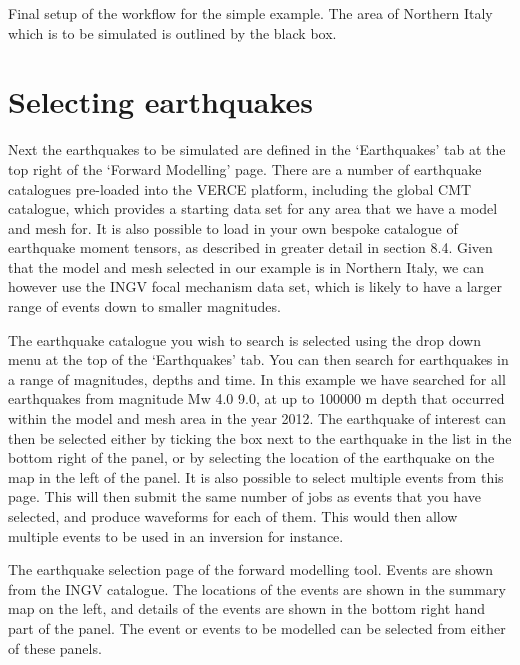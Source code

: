 \documentclass[english]{book}
\begin{document}

 Final setup of the workflow for the simple example. The
area of Northern Italy which is to be simulated is outlined by the black
box.


\section{Selecting earthquakes}
\label{\detokenize{Section5:selecting-earthquakes}}
Next the earthquakes to be simulated are defined in the ‘Earthquakes’
tab at the top right of the ‘Forward Modelling’ page. There are a number
of earthquake catalogues pre-loaded into the VERCE platform, including
the global CMT catalogue, which provides a starting data set for any
area that we have a model and mesh for. It is also possible to load in
your own bespoke catalogue of earthquake moment tensors, as described in
greater detail in section 8.4. Given that the model and mesh selected in
our example is in Northern Italy, we can however use the INGV focal
mechanism data set, which is likely to have a larger range of events
down to smaller magnitudes.

The earthquake catalogue you wish to search is selected using the drop
down menu at the top of the ‘Earthquakes’ tab. You can then search for
earthquakes in a range of magnitudes, depths and time. In this example
we have searched for all earthquakes from magnitude Mw 4.0 \textendash{} 9.0, at up
to 100000 m depth that occurred within the model and mesh area in the
year 2012. The earthquake of interest can then be selected either by
ticking the box next to the earthquake in the list in the bottom right
of the panel, or by selecting the location of the earthquake on the map
in the left of the panel. It is also possible to select multiple events
from this page. This will then submit the same number of jobs as events
that you have selected, and produce waveforms for each of them. This
would then allow multiple events to be used in an inversion for
instance.


 The earthquake selection page of the forward modelling
tool. Events are shown from the INGV catalogue. The locations of the
events are shown in the summary map on the left, and details of the
events are shown in the bottom right hand part of the panel. The event
or events to be modelled can be selected from either of these panels.
\end{document}
